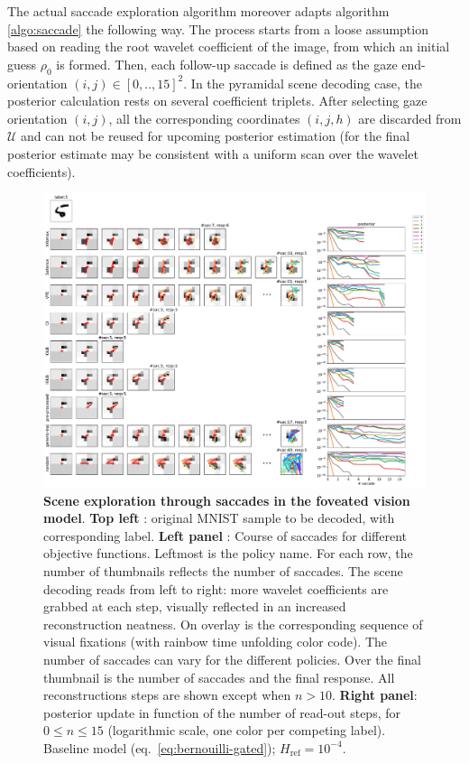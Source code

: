 \documentclass[12pt,twoside,openright]{article}
\begin{document}
The actual saccade exploration algorithm moreover adapts algorithm \ref{algo:saccade} the following way. The process starts from a loose assumption based on reading the root wavelet coefficient of the image, from which an initial guess $\rho_0$ is formed. Then, each follow-up saccade is {\color{Purple} defined as the gaze end-orientation} $(i,j) \in [0,..,15]^2$. {\color{Purple}In the pyramidal scene decoding case}, the posterior calculation rests on several coefficient triplets. After selecting gaze orientation $(i,j)$, all the corresponding coordinates $(i,j,h)$ are discarded from $\mathcal{U}$ and can not be reused for upcoming posterior estimation (for the final posterior estimate may be consistent with a uniform scan over the wavelet coefficients). 

\begin{figure}[t!]
	\includegraphics[width=\linewidth]{img/frontiers_trajectories_0.pdf}

	\caption{\textbf{Scene exploration through saccades in the foveated vision model}.\textbf{ Top left} : original MNIST sample to be decoded, with corresponding label. \textbf{Left panel} : Course of saccades for different objective functions. Leftmost is the policy name. For each row, the number of thumbnails reflects the number of saccades.  The scene decoding reads from left to right: more wavelet coefficients are grabbed at each step, visually reflected in an increased reconstruction neatness. On overlay is the corresponding sequence of visual fixations (with rainbow time unfolding color code). The number of saccades can vary for the different policies. Over the final thumbnail is the number of saccades and the final response. All reconstructions steps are shown except when $n>10$. \textbf{Right panel}: posterior update in function of the number of read-out steps, for $0 \leq n \leq 15$ (logarithmic scale, one color per competing label). Baseline model (eq.~\ref{eq:bernouilli-gated}); $H_\text{ref} = 10^{-4}$. }\label{fig:foveated-saccades}
\end{figure}
\end{document}
